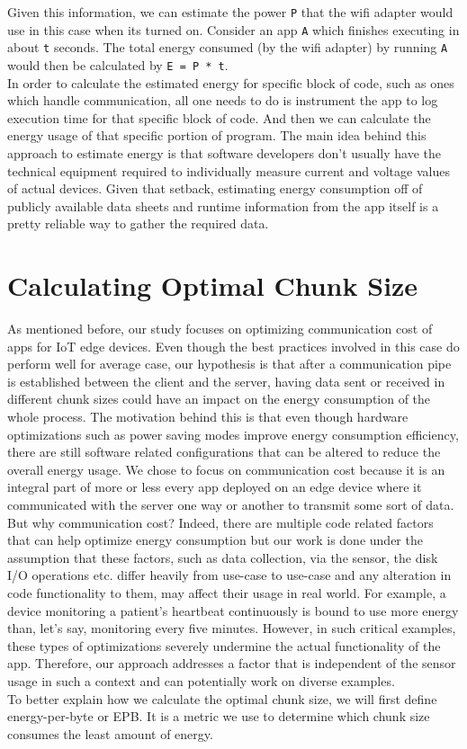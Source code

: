 Given this information, we can estimate the power \texttt{P} that the wifi adapter would use in this case when its 
turned on. Consider an app \texttt{A} which finishes executing in about \texttt{t} seconds. The total energy 
consumed (by the wifi adapter) by running \texttt{A} would then be calculated by \texttt{E = P * t}. \\
In order to calculate the estimated energy for specific block of code, such as ones which handle communication, all one 
needs to do is instrument the app to log execution time for that specific block of code. And then we can 
calculate the energy usage of that specific portion of program. The main idea behind this approach to 
estimate energy is that software developers don't usually have the technical equipment required to 
individually measure current and voltage values of actual devices. Given that setback, estimating energy 
consumption off of publicly available data sheets and runtime information from the app itself is a 
pretty reliable way to gather the required data. \\

\section{Calculating Optimal Chunk Size}
As mentioned before, our study focuses on optimizing communication cost of apps for IoT edge devices. 
Even though the best practices involved in this case do perform well for average case, our hypothesis 
is that after a communication pipe is established between the client and the server, having data sent or 
received in different chunk sizes could have an impact on the energy consumption of the whole process. 
The motivation behind this is that even though hardware optimizations such as power saving modes improve 
energy consumption efficiency, there are still software related configurations that can be altered to reduce 
the overall energy usage. We chose to focus on communication cost because it is an integral part of more or less 
every app deployed on an edge device where it communicated with the server one way or another to transmit 
some sort of data. \\
But why communication cost? Indeed, there are multiple code related factors that can help optimize energy 
consumption but our work is done under the assumption that these factors, such as data collection, via the 
sensor, the disk I/O operations etc. differ heavily from use-case to use-case and any alteration in code 
functionality to them, may affect their usage in real world. For example, a device monitoring a patient's 
heartbeat continuously is bound to use more energy than, let's say, monitoring every five minutes. 
However, in such critical examples, these types of optimizations severely undermine the actual 
functionality of the app. Therefore, our approach addresses a factor that is independent of the sensor 
usage in such a context and can potentially work on diverse examples. \\
To better explain how we calculate the optimal chunk size, we will first define energy-per-byte or EPB. 
It is a metric we use to determine which chunk size consumes the least amount of energy. \\

